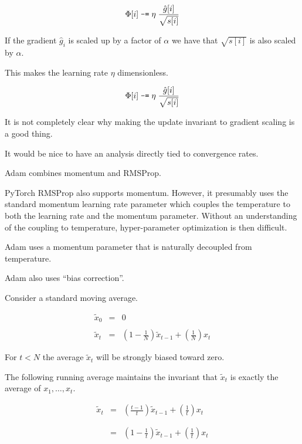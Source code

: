 {{\color{red} $$\Phi[i] \;\mbox{\tt -=} \; \eta\;\frac{\hat{g}[i]}{\sqrt{s[i]}}$$}

If the gradient $\hat{g}_i$ is scaled up by a factor of $\alpha$ we have that $\sqrt{s[i]}$ is also scaled by $\alpha$.

\vfill
This makes the learning rate $\eta$ dimensionless.


{\color{red} $$\Phi[i] \;\mbox{\tt -=} \; \eta\;\frac{\hat{g}[i]}{\sqrt{s[i]}}$$}

\vfill
It is not completely clear why making the update invariant to gradient scaling is a good thing.

\vfill
It would be nice to have an analysis directly tied to convergence rates.


Adam combines momentum and RMSProp.

\vfill
PyTorch RMSProp also supports momentum.  However, it presumably uses the standard momentum learning rate parameter which couples the temperature to both
the learning rate and the momentum parameter.  Without an understanding of the coupling to temperature, hyper-parameter optimization is then difficult.

\vfill
Adam uses a momentum parameter that is naturally decoupled from temperature.

\vfill
Adam also uses ``bias correction''.


Consider a standard moving average.

\begin{eqnarray*}
\tilde{x}_0 & = & 0 \\
\\
\tilde{x}_t & = & \left(1-\frac{1}{N}\right)\tilde{x}_{t-1} + \left(\frac{1}{N}\right)x_t
\end{eqnarray*}

\vfill
For $t < N$ the average $\tilde{x}_t$ will be strongly biased toward zero.


The following running average maintains the invariant that $\tilde{x}_t$ is exactly the average of $x_1,\ldots,x_t$.

\begin{eqnarray*}
\tilde{x}_t & = & \left(\frac{t-1}{t}\right)\tilde{x}_{t-1} + \left(\frac{1}{t}\right)x_t \\
\\
\\
& = & \left(1-\frac{1}{t}\right)\tilde{x}_{t-1} + \left(\frac{1}{t}\right)x_t
\end{eqnarray*}

}

